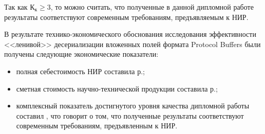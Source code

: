 Так как $ \text{К}_{\text{к}} \ge 3 $, то можно считать, что полученные в данной дипломной работе результаты соответствуют современным требованиям, предъявляемым к НИР.

В результате технико-экономического обоснования исследования эффективности <<ленивой>> десериализации вложенных полей формата Protocol Buffers были получены следующие экономические показатели:
\begin{itemize}
    \item полная себестоимость НИР составила \fullPayment р.;
    \item сметная стоимость научно-технической продукции составила \smetPrice р.;
    \item комплексный показатель достигнутого уровня качества дипломной работы составил \criteriasResult, что говорит о том, что полученные результаты соответствуют современным требованиям, предъявленным к НИР.
\end{itemize}
